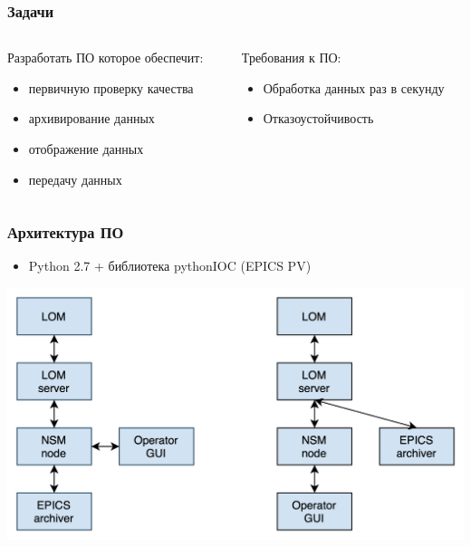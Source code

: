 \documentclass{beamer}
\begin{document}
\begin{frame}
\frametitle{Задачи}
    \begin{columns}
    \begin{column}{0.5\textwidth}
    Разработать ПО которое обеспечит:
      \begin{itemize}
          \item первичную проверку качества
          \item архивирование данных
          \item отображение данных
          \item передачу данных
      \end{itemize}
    \end{column}
    \begin{column}{0.5\textwidth}
    Требования к ПО:
    \begin{itemize}
      \item Обработка данных раз в секунду
      \item Отказоустойчивость
    \end{itemize}
    \end{column}
    \end{columns}
\end{frame}

\begin{frame}
\frametitle{Архитектура ПО}
    \begin{itemize}
        \item Python 2.7 + библиотека pythonIOC (EPICS PV)
    \end{itemize}
\includegraphics[width=\textwidth]{Architecture.png}
\end{frame}
\end{document}
